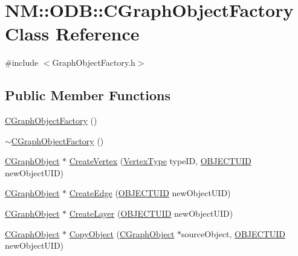 \hypertarget{class_n_m_1_1_o_d_b_1_1_c_graph_object_factory}{}\section{N\+M\+:\+:O\+D\+B\+:\+:C\+Graph\+Object\+Factory Class Reference}
\label{class_n_m_1_1_o_d_b_1_1_c_graph_object_factory}


{\ttfamily \#include $<$Graph\+Object\+Factory.\+h$>$}

\subsection*{Public Member Functions}
\begin{DoxyCompactItemize}
\item 
\hyperlink{class_n_m_1_1_o_d_b_1_1_c_graph_object_factory_ae1c2e57835dc22190a2ecf2f90cd7c4d}{C\+Graph\+Object\+Factory} ()
\item 
\hyperlink{class_n_m_1_1_o_d_b_1_1_c_graph_object_factory_a15169af2b7329d43da6cdaecfb4d841c}{$\sim$\+C\+Graph\+Object\+Factory} ()
\item 
\hyperlink{class_n_m_1_1_o_d_b_1_1_c_graph_object}{C\+Graph\+Object} $\ast$ \hyperlink{class_n_m_1_1_o_d_b_1_1_c_graph_object_factory_ace27a19e4e37e1d0544faf229770fa8a}{Create\+Vertex} (\hyperlink{namespace_n_m_1_1_o_d_b_a74e0c94daaeea6f7e783c03a8c921022}{Vertex\+Type} type\+I\+D, \hyperlink{namespace_n_m_1_1_o_d_b_a262b64fab56baaa96e18bac4ada88265}{O\+B\+J\+E\+C\+T\+U\+I\+D} new\+Object\+U\+I\+D)
\item 
\hyperlink{class_n_m_1_1_o_d_b_1_1_c_graph_object}{C\+Graph\+Object} $\ast$ \hyperlink{class_n_m_1_1_o_d_b_1_1_c_graph_object_factory_adf2474369e156ecc0de04e11fb17ba67}{Create\+Edge} (\hyperlink{namespace_n_m_1_1_o_d_b_a262b64fab56baaa96e18bac4ada88265}{O\+B\+J\+E\+C\+T\+U\+I\+D} new\+Object\+U\+I\+D)
\item 
\hyperlink{class_n_m_1_1_o_d_b_1_1_c_graph_object}{C\+Graph\+Object} $\ast$ \hyperlink{class_n_m_1_1_o_d_b_1_1_c_graph_object_factory_a75d4e5f337448a33e5a62ee381a89085}{Create\+Layer} (\hyperlink{namespace_n_m_1_1_o_d_b_a262b64fab56baaa96e18bac4ada88265}{O\+B\+J\+E\+C\+T\+U\+I\+D} new\+Object\+U\+I\+D)
\item 
\hyperlink{class_n_m_1_1_o_d_b_1_1_c_graph_object}{C\+Graph\+Object} $\ast$ \hyperlink{class_n_m_1_1_o_d_b_1_1_c_graph_object_factory_a0d75b9562865e1d628f02188408659bd}{Copy\+Object} (\hyperlink{class_n_m_1_1_o_d_b_1_1_c_graph_object}{C\+Graph\+Object} $\ast$source\+Object, \hyperlink{namespace_n_m_1_1_o_d_b_a262b64fab56baaa96e18bac4ada88265}{O\+B\+J\+E\+C\+T\+U\+I\+D} new\+Object\+U\+I\+D)

\end{DoxyCompactItemize}
